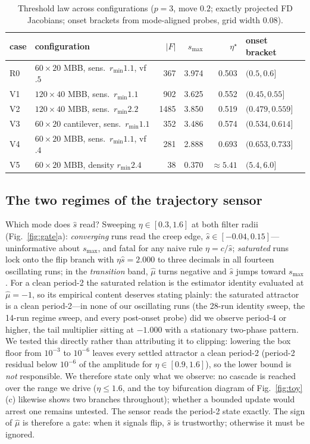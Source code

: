\documentclass[11pt,a4paper]{article}
\newcommand{\smax}{s_{\max}}
\newcommand{\etastar}{\eta^{\star}}
\newcommand{\muh}{\hat{\mu}}
\newcommand{\sh}{\hat{s}}
\begin{document}
\begin{table}[t]
\centering\small
\caption{Threshold law across configurations ($p=3$, move $0.2$;
exactly projected FD Jacobians; onset brackets from mode-aligned probes,
grid width $0.08$).}
\label{tab:robust}
\begin{tabular}{llrrrl}
\toprule
case & configuration & $|F|$ & $\smax$ & $\etastar$ & onset bracket \\
\midrule
R0 & $60{\times}20$ MBB, sens.\ $r_{\min}1.1$, vf $.5$ & 367 & 3.974 & 0.503 & $(0.5,0.6]$ \\
V1 & $120{\times}40$ MBB, sens.\ $r_{\min}1.1$          & 902 & 3.625 & 0.552 & $(0.45,0.55]$ \\
V2 & $120{\times}40$ MBB, sens.\ $r_{\min}2.2$          & 1485 & 3.850 & 0.519 & $(0.479,0.559]$ \\
V3 & $60{\times}20$ cantilever, sens.\ $r_{\min}1.1$    & 352 & 3.486 & 0.574 & $(0.534,0.614]$ \\
V4 & $60{\times}20$ MBB, sens.\ $r_{\min}1.1$, vf $.4$  & 281 & 2.888 & 0.693 & $(0.653,0.733]$ \\
V5 & $60{\times}20$ MBB, density $r_{\min}2.4$          & 38  & 0.370 & $\approx5.41$ & $(5.4,6.0]$ \\
\bottomrule
\end{tabular}
\end{table}

\subsection{The two regimes of the trajectory sensor}\label{sec:regimes}

Which mode does $\sh$ read? Sweeping $\eta\in[0.3,1.6]$ at both filter
radii (Fig.~\ref{fig:gate}a): \emph{converging} runs read the creep
edge, $\sh\in[-0.04,0.15]$---uninformative about $\smax$, and fatal for
any naive rule $\eta=c/\sh$; \emph{saturated} runs lock onto the flip
branch with $\eta\sh=2.000$ to three decimals in all fourteen
oscillating runs; in the \emph{transition} band, $\muh$ turns negative
and $\sh$ jumps toward $\smax$. For a clean period-2 the saturated
relation is the estimator identity evaluated at $\muh=-1$, so its
empirical content deserves stating plainly: the saturated attractor is
a clean period-2---in none of our oscillating runs (the 28-run identity
sweep, the 14-run regime sweep, and every post-onset probe) did we
observe period-4 or higher, the tail multiplier sitting at $-1.000$
with a stationary two-phase pattern. We tested this directly rather than
attributing it to clipping: lowering the box floor from $10^{-3}$ to
$10^{-6}$ leaves every settled attractor a clean period-2 (period-2
residual below $10^{-6}$ of the amplitude for $\eta\in[0.9,1.6]$), so
the lower bound is \emph{not} responsible. We therefore state only what
we observe: no cascade is reached over the range we drive
($\eta\le1.6$, and the toy bifurcation diagram of
Fig.~\ref{fig:toy}(c) likewise shows two branches throughout); whether
a bounded update would arrest one remains untested. The sensor reads
the period-2 state exactly. The sign of $\muh$ is therefore a gate: when
it signals flip, $\sh$ is trustworthy; otherwise it must be ignored.
\end{document}
